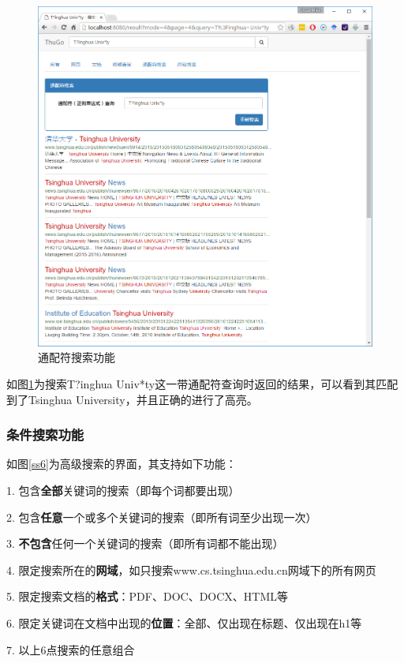 \documentclass[paper=a4, fontsize=11pt, UTF8]{article} %
\numberwithin{equation}{section} %
\numberwithin{figure}{section} %
\numberwithin{table}{section} %
\begin{document}
\begin{figure}[htp]
\center
\includegraphics[width=\textwidth]{ss5}
\caption{通配符搜索功能} \label{ss5}
\end{figure}

如图\ref{ss5}为搜索T?inghua Univ*ty这一带通配符查询时返回的结果，可以看到其匹配到了Tsinghua University，并且正确的进行了高亮。

\subsubsection{条件搜索功能}

如图\ref{ss6}为高级搜索的界面，其支持如下功能：

1. 包含\textbf{全部}关键词的搜索（即每个词都要出现）

2. 包含\textbf{任意}一个或多个关键词的搜索（即所有词至少出现一次）

3. \textbf{不包含}任何一个关键词的搜索（即所有词都不能出现）

4. 限定搜索所在的\textbf{网域}，如只搜索www.cs.tsinghua.edu.cn网域下的所有网页

5. 限定搜索文档的\textbf{格式}：PDF、DOC、DOCX、HTML等

6. 限定关键词在文档中出现的\textbf{位置}：全部、仅出现在标题、仅出现在h1等

7. 以上6点搜索的任意组合
\end{document}
